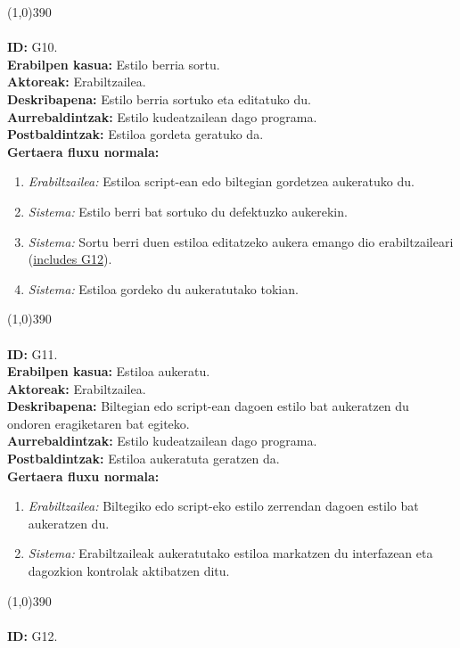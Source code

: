 \line(1,0){390}\\
\noindent\\
\textbf{ID:} G10.\\
\textbf{Erabilpen kasua:} Estilo berria sortu.\\
\textbf{Aktoreak:} Erabiltzailea.\\
\textbf{Deskribapena:} Estilo berria sortuko eta editatuko du.\\
\textbf{Aurrebaldintzak:} Estilo kudeatzailean dago programa.\\
\textbf{Postbaldintzak:} Estiloa gordeta geratuko da.\\
\textbf{Gertaera fluxu normala:}
\begin{enumerate}
	\item \textit{Erabiltzailea:} Estiloa script-ean edo biltegian gordetzea aukeratuko du.
	\item \textit{Sistema:} Estilo berri bat sortuko du defektuzko aukerekin.
	\item \textit{Sistema:} Sortu berri duen estiloa editatzeko aukera emango dio erabiltzaileari (\underline{includes G12}).
	\item \textit{Sistema:} Estiloa gordeko du aukeratutako tokian.
\end{enumerate}
\line(1,0){390}\\
\noindent\\
\textbf{ID:} G11.\\
\textbf{Erabilpen kasua:} Estiloa aukeratu.\\
\textbf{Aktoreak:} Erabiltzailea.\\
\textbf{Deskribapena:} Biltegian edo script-ean dagoen estilo bat aukeratzen du ondoren eragiketaren bat egiteko.\\
\textbf{Aurrebaldintzak:} Estilo kudeatzailean dago programa.\\
\textbf{Postbaldintzak:} Estiloa aukeratuta geratzen da.\\
\textbf{Gertaera fluxu normala:}
\begin{enumerate}
	\item \textit{Erabiltzailea:} Biltegiko edo script-eko estilo zerrendan dagoen estilo bat aukeratzen du.
	\item \textit{Sistema:} Erabiltzaileak aukeratutako estiloa markatzen du interfazean eta dagozkion kontrolak aktibatzen ditu.
\end{enumerate}
\line(1,0){390}\\
\noindent\\
\textbf{ID:} G12.\\
